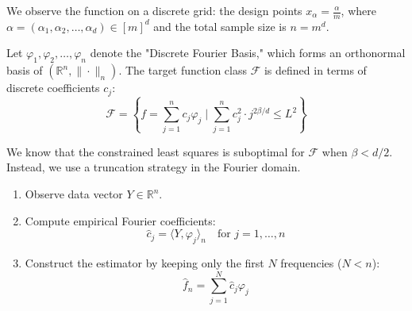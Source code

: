 We observe the function on a discrete grid: the design points $x_\alpha = \frac{\alpha}{m}$, where $\alpha = (\alpha_1, \alpha_2, \dots, \alpha_d) \in [m]^d$ and the total sample size is $n = m^d$.

Let $\varphi_1, \varphi_2, \dots, \varphi_n$ denote the "Discrete Fourier Basis," which forms an orthonormal basis of $(\mathbb{R}^n, \|\cdot\|_n)$. The target function class $\mathcal{F}$ is defined in terms of discrete coefficients $c_j$:
\begin{equation*}
    \mathcal{F} = \left\{ f = \sum_{j=1}^n c_j \varphi_j \;\Bigg|\; \sum_{j=1}^n c_j^2 \cdot j^{2\beta/d} \le L^2 \right\}
\end{equation*}

We know that the constrained least squares is suboptimal for $\mathcal{F}$ when $\beta < d/2$. Instead, we use a truncation strategy in the Fourier domain.

\begin{enumerate}
    \item Observe data vector $Y \in \mathbb{R}^n$.
    \item Compute empirical Fourier coefficients:
    \begin{equation*}
        \hat{c}_j = \langle Y, \varphi_j \rangle_n \quad \text{for } j=1, \dots, n
    \end{equation*}
    \item Construct the estimator by keeping only the first $N$ frequencies ($N < n$):
    \begin{equation*}
        \hat{f}_n = \sum_{j=1}^N \hat{c}_j \varphi_j
    \end{equation*}
\end{enumerate}


